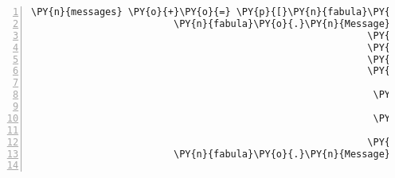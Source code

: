 \begin{Verbatim}[commandchars=\\\{\},numbers=left,firstnumber=1,stepnumber=1]
            \PY{n}{messages} \PY{o}{+}\PY{o}{=} \PY{p}{[}\PY{n}{fabula}\PY{o}{.}\PY{n}{Message}\PY{p}{(}\PY{p}{[}\PY{n}{fabula}\PY{o}{.}\PY{n}{DeleteEvent}\PY{p}{(}\PY{n}{identifier}\PY{o}{=}\PY{l+s}{\PYZsq{}}\PY{l+s}{cobweb}\PY{l+s}{\PYZsq{}}\PY{p}{)}\PY{p}{]}\PY{p}{)}\PY{p}{,}
                         \PY{n}{fabula}\PY{o}{.}\PY{n}{Message}\PY{p}{(}\PY{p}{[}\PY{n}{fabula}\PY{o}{.}\PY{n}{SpawnEvent}\PY{p}{(}\PY{n}{fabula}\PY{o}{.}\PY{n}{Entity}\PY{p}{(}\PY{l+s}{\PYZsq{}}\PY{l+s}{bridge}\PY{l+s}{\PYZsq{}}\PY{p}{,}
                                                           \PY{n}{fabula}\PY{o}{.}\PY{n}{ITEM}\PY{p}{,}
                                                           \PY{n+nb+bp}{False}\PY{p}{,}
                                                           \PY{n+nb+bp}{False}\PY{p}{,}
                                                           \PY{p}{\PYZob{}}\PY{l+s}{\PYZsq{}}\PY{l+s}{image/png}\PY{l+s}{\PYZsq{}}\PY{p}{:} \PY{n}{fabula}\PY{o}{.}\PY{n}{Asset}\PY{p}{(}\PY{n}{uri}\PY{o}{=}\PY{l+s}{\PYZsq{}}\PY{l+s}{1x1\PYZhy{}empty.png}\PY{l+s}{\PYZsq{}}\PY{p}{,}
                                                                                      \PY{n}{data}\PY{o}{=}\PY{n+nb+bp}{None}\PY{p}{)}\PY{p}{,}
                                                            \PY{l+s}{\PYZsq{}}\PY{l+s}{audio/ogg}\PY{l+s}{\PYZsq{}}\PY{p}{:} \PY{n}{fabula}\PY{o}{.}\PY{n}{Asset}\PY{p}{(}\PY{n}{uri}\PY{o}{=}\PY{l+s}{\PYZsq{}}\PY{l+s}{teleport.ogg}\PY{l+s}{\PYZsq{}}\PY{p}{,}
                                                                                      \PY{n}{data}\PY{o}{=}\PY{n+nb+bp}{None}\PY{p}{)}\PY{p}{,}
                                                            \PY{l+s}{\PYZsq{}}\PY{l+s}{text/plain}\PY{l+s}{\PYZsq{}}\PY{p}{:} \PY{n}{fabula}\PY{o}{.}\PY{n}{Asset}\PY{p}{(}\PY{n}{uri}\PY{o}{=}\PY{l+s}{\PYZsq{}}\PY{l+s}{bridge.txt}\PY{l+s}{\PYZsq{}}\PY{p}{,}
                                                                                      \PY{n}{data}\PY{o}{=}\PY{n+nb+bp}{None}\PY{p}{)}\PY{p}{\PYZcb{}}\PY{p}{)}\PY{p}{,}
                                                           \PY{n}{room}\PY{o}{.}\PY{n}{entity\PYZus{}locations}\PY{p}{[}\PY{l+s}{\PYZsq{}}\PY{l+s}{sign}\PY{l+s}{\PYZsq{}}\PY{p}{]} \PY{o}{+} \PY{p}{(}\PY{n}{room}\PY{o}{.}\PY{n}{identifier}\PY{p}{,}\PY{p}{)}\PY{p}{)}\PY{p}{]}\PY{p}{)}\PY{p}{,}
                         \PY{n}{fabula}\PY{o}{.}\PY{n}{Message}\PY{p}{(}\PY{p}{[}\PY{n}{fabula}\PY{o}{.}\PY{n}{DeleteEvent}\PY{p}{(}\PY{n}{identifier}\PY{o}{=}\PY{l+s}{\PYZsq{}}\PY{l+s}{sign}\PY{l+s}{\PYZsq{}}\PY{p}{)}\PY{p}{]}\PY{p}{)}\PY{p}{]}


\end{Verbatim}
